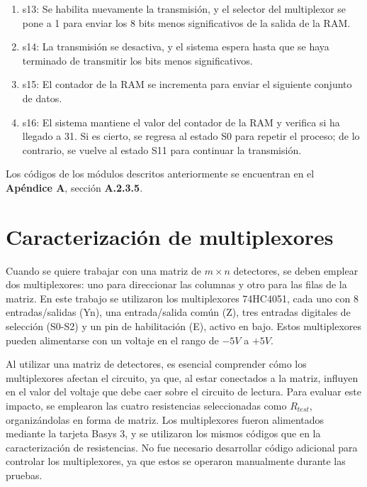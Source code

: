 \begin{itemize}
\begin{enumerate}
     \item s13: Se habilita nuevamente la transmisión, y el selector del multiplexor se pone a 1 para enviar los 8 bits menos significativos de la salida de la RAM.
     \item s14: La transmisión se desactiva, y el sistema espera hasta que se haya terminado de transmitir los bits menos significativos.
     \item s15: El contador de la RAM se incrementa para enviar el siguiente conjunto de datos.
     \item s16: El sistema mantiene el valor del contador de la RAM y verifica si ha llegado a 31. Si es cierto, se regresa al estado S0 para repetir el proceso; de lo contrario, se vuelve al estado S11 para continuar la transmisión.           
    \end{enumerate}
\end{itemize}

Los códigos de los módulos descritos anteriormente se encuentran en el \textbf{Apéndice A}, sección \textbf{A.2.3.5}.


\section{Caracterización de multiplexores}
Cuando se quiere trabajar con una matriz de $m \times n$ detectores, se deben emplear dos multiplexores: uno para direccionar las columnas y otro para las filas de la matriz. En este trabajo se utilizaron los multiplexores 74HC4051, cada uno con 8 entradas/salidas (Yn), una entrada/salida común (Z), tres entradas digitales de selección (S0-S2) y un pin de habilitación (E), activo en bajo. Estos multiplexores pueden alimentarse con un voltaje en el rango de $-5V$ a $+5V$.


Al utilizar una matriz de detectores, es esencial comprender cómo los multiplexores afectan el circuito, ya que, al estar conectados a la matriz, influyen en el valor del voltaje que debe caer sobre el circuito de lectura. Para evaluar este impacto, se emplearon las cuatro resistencias seleccionadas como $R_{test}$, organizándolas en forma de matriz. Los multiplexores fueron alimentados mediante la tarjeta Basys 3, y se utilizaron los mismos códigos que en la caracterización de resistencias. No fue necesario desarrollar código adicional para controlar los multiplexores, ya que estos se operaron manualmente durante las pruebas.


